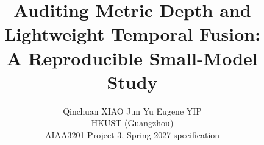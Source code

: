 \documentclass[10pt,twocolumn,letterpaper]{article}
\title{Auditing Metric Depth and Lightweight Temporal Fusion:\\A Reproducible Small-Model Study}
\author{Qinchuan XIAO \qquad Jun Yu Eugene YIP\\HKUST (Guangzhou)\\AIAA3201 Project 3, Spring 2027 specification}
\begin{document}
\maketitle








\clearpage
{\small}
\end{document}
